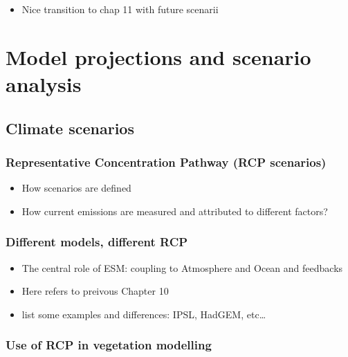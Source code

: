 \documentclass[
  oneside]{book}
\providecommand{\tightlist}{%
  \setlength{\itemsep}{0pt}\setlength{\parskip}{0pt}}
\begin{document}
\begin{itemize}
\tightlist
\item
  Nice transition to chap 11 with future scenarii
\end{itemize}

\hypertarget{model-projections-and-scenario-analysis}{%
\chapter{Model projections and scenario analysis}\label{model-projections-and-scenario-analysis}}


\hypertarget{climate-scenarios}{%
\section{Climate scenarios}\label{climate-scenarios}}

\hypertarget{representative-concentration-pathway-rcp-scenarios}{%
\subsection{Representative Concentration Pathway (RCP scenarios)}\label{representative-concentration-pathway-rcp-scenarios}}

\begin{itemize}
\tightlist
\item
  How scenarios are defined
\item
  How current emissions are measured and attributed to different factors?
\end{itemize}

\hypertarget{different-models-different-rcp}{%
\subsection{Different models, different RCP}\label{different-models-different-rcp}}

\begin{itemize}
\tightlist
\item
  The central role of ESM: coupling to Atmosphere and Ocean and feedbacks
\item
  Here refers to preivous Chapter 10
\item
  list some examples and differences: IPSL, HadGEM, etc\ldots{}
\end{itemize}

\hypertarget{use-of-rcp-in-vegetation-modelling}{%
\subsection{Use of RCP in vegetation modelling}\label{use-of-rcp-in-vegetation-modelling}}
\end{document}
